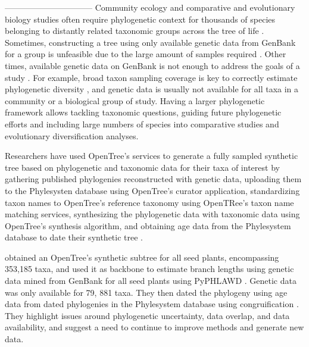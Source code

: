 \documentclass[oupdraft]{sysbio_sse}
\begin{document}
--------------------------------
Community ecology and comparative and evolutionary biology studies often require
phylogenetic context for thousands of species belonging to distantly related taxonomic
groups across the tree of life \citep{smith2018constructing}.
Sometimes, constructing a tree using only available genetic data from GenBank for a group
is unfeasible due to the large amount of samples required \citep{smith2018constructing}.
Other times, available genetic data on GenBank is not enough to address the goals
of a study \citep{owen2015synthetic, brown2017development, ewers2019towards}.
For example, broad taxon sampling coverage is key to correctly estimate phylogenetic
diversity \citep{jantzen2019effects, park2018taxon}, and genetic data is usually
not available for all taxa in a community or a biological group of study.
Having a larger phylogenetic framework allows tackling taxonomic questions,
guiding future phylogenetic efforts and including large numbers of species into
comparative studies \citep{ewers2019towards} and evolutionary diversification analyses.

Researchers have used OpenTree's services to generate a fully sampled synthetic tree based on phylogenetic and
taxonomic data for their taxa of interest
by gathering published phylogenies reconstructed with genetic data,
uploading them to the Phylesysten database using OpenTree's curator application,
standardizing taxon names to OpenTree's reference taxonomy using OpenTRee's taxon
name matching services, synthesizing the phylogenetic data with taxonomic data
using OpenTree's synthesis algorithm, and obtaining age data from the Phylesystem
database to date their synthetic tree
\citep{owen2015synthetic, brown2017development, ewers2019towards, smith2018constructing}.

\citep{smith2018constructing} obtained an OpenTree's synthetic subtree for all seed
plants, encompassing 353,185 taxa, and used it as backbone to estimate branch lengths
using genetic data mined from GenBank for all seed plants using PyPHLAWD \citep{smith2019pyphlawd}.
Genetic data was only available for 79, 881 taxa. They then dated the phylogeny using age data
from dated phylogenies in the Phylesystem database using congruification \citep{eastman2013congruification}.
They highlight issues around phylogenetic uncertainty, data overlap, and data availability,
and suggest a need to continue to improve methods and generate new data.
\end{document}
